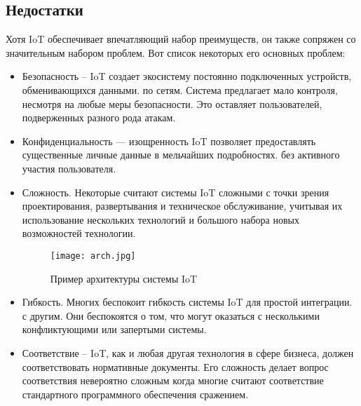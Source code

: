 \subsection{Недостатки}
Хотя IoT обеспечивает впечатляющий набор преимуществ, он также сопряжен со значительным набором проблем.
Вот список некоторых его основных проблем:
\begin{itemize}
    \item Безопасность – IoT создает экосистему постоянно подключенных устройств, обменивающихся данными.
    по сетям. Система предлагает мало контроля, несмотря на любые меры безопасности. Это оставляет
    пользователей, подверженных разного рода атакам.
    \item Конфиденциальность — изощренность IoT позволяет предоставлять существенные личные данные в мельчайших подробностях.
    без активного участия пользователя.
    \item Сложность. Некоторые считают системы IoT сложными с точки зрения проектирования, развертывания и
    техническое обслуживание, учитывая их использование нескольких технологий и большого набора новых возможностей
    технологии.
    \begin{figure}[h!]
        \centering
        \texttt{[image: arch.jpg]}
        \caption{Пример архитектуры системы IoT}
        \label{fig:section3:arch}
    \end{figure}
    \item Гибкость. Многих беспокоит гибкость системы IoT для простой интеграции.
    с другим. Они беспокоятся о том, что могут оказаться с несколькими конфликтующими или запертыми
    системы.
    \item Соответствие – IoT, как и любая другая технология в сфере бизнеса, должен соответствовать
    нормативные документы. Его сложность делает вопрос соответствия невероятно сложным
    когда многие считают соответствие стандартного программного обеспечения сражением.
\end{itemize}